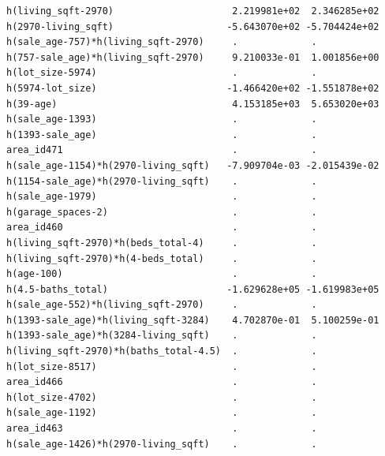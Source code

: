 \documentclass[
]{article}
\begin{document}
\begin{verbatim}
h(living_sqft-2970)                     2.219981e+02  2.346285e+02
h(2970-living_sqft)                    -5.643070e+02 -5.704424e+02
h(sale_age-757)*h(living_sqft-2970)     .             .           
h(757-sale_age)*h(living_sqft-2970)     9.210033e-01  1.001856e+00
h(lot_size-5974)                        .             .           
h(5974-lot_size)                       -1.466420e+02 -1.551878e+02
h(39-age)                               4.153185e+03  5.653020e+03
h(sale_age-1393)                        .             .           
h(1393-sale_age)                        .             .           
area_id471                              .             .           
h(sale_age-1154)*h(2970-living_sqft)   -7.909704e-03 -2.015439e-02
h(1154-sale_age)*h(2970-living_sqft)    .             .           
h(sale_age-1979)                        .             .           
h(garage_spaces-2)                      .             .           
area_id460                              .             .           
h(living_sqft-2970)*h(beds_total-4)     .             .           
h(living_sqft-2970)*h(4-beds_total)     .             .           
h(age-100)                              .             .           
h(4.5-baths_total)                     -1.629628e+05 -1.619983e+05
h(sale_age-552)*h(living_sqft-2970)     .             .           
h(1393-sale_age)*h(living_sqft-3284)    4.702870e-01  5.100259e-01
h(1393-sale_age)*h(3284-living_sqft)    .             .           
h(living_sqft-2970)*h(baths_total-4.5)  .             .           
h(lot_size-8517)                        .             .           
area_id466                              .             .           
h(lot_size-4702)                        .             .           
h(sale_age-1192)                        .             .           
area_id463                              .             .           
h(sale_age-1426)*h(2970-living_sqft)    .             .           
                                                                  

\end{verbatim}
\end{document}
